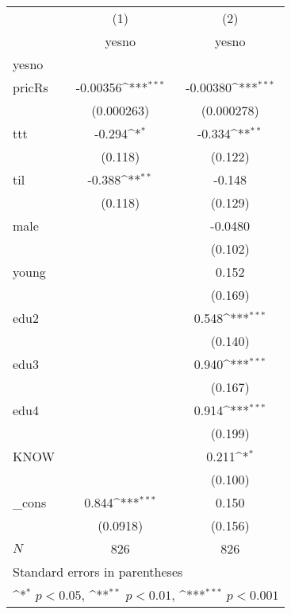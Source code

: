 {
\def\sym#1{\ifmmode^{#1}\else\(^{#1}\)\fi}
\begin{tabular}{l*{2}{c}}
\hline\hline
            &\multicolumn{1}{c}{(1)}&\multicolumn{1}{c}{(2)}\\
            &\multicolumn{1}{c}{yesno}&\multicolumn{1}{c}{yesno}\\
\hline
yesno       &                     &                     \\
pricRs      &    -0.00356\sym{***}&    -0.00380\sym{***}\\
            &  (0.000263)         &  (0.000278)         \\
[1em]
ttt         &      -0.294\sym{*}  &      -0.334\sym{**} \\
            &     (0.118)         &     (0.122)         \\
[1em]
til         &      -0.388\sym{**} &      -0.148         \\
            &     (0.118)         &     (0.129)         \\
[1em]
male        &                     &     -0.0480         \\
            &                     &     (0.102)         \\
[1em]
young       &                     &       0.152         \\
            &                     &     (0.169)         \\
[1em]
edu2        &                     &       0.548\sym{***}\\
            &                     &     (0.140)         \\
[1em]
edu3        &                     &       0.940\sym{***}\\
            &                     &     (0.167)         \\
[1em]
edu4        &                     &       0.914\sym{***}\\
            &                     &     (0.199)         \\
[1em]
KNOW        &                     &       0.211\sym{*}  \\
            &                     &     (0.100)         \\
[1em]
\_cons      &       0.844\sym{***}&       0.150         \\
            &    (0.0918)         &     (0.156)         \\
\hline
\(N\)       &         826         &         826         \\
\hline\hline
\multicolumn{3}{l}{\footnotesize Standard errors in parentheses}\\
\multicolumn{3}{l}{\footnotesize \sym{*} \(p<0.05\), \sym{**} \(p<0.01\), \sym{***} \(p<0.001\)}\\
\end{tabular}
}
